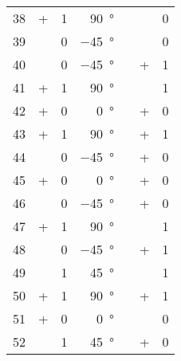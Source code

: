 \begin{longtable}[c]{rccrccc}
	38\hspace{1.5em} &      + & 1 & \qty{ 90}{\degree}\hspace{1.5em} &  & \times & 0 \\
	39\hspace{1.5em} & \times & 0 & \qty{-45}{\degree}\hspace{1.5em} &  & \times & 0 \\
	40\hspace{1.5em} & \times & 0 & \qty{-45}{\degree}\hspace{1.5em} &  &      + & 1 \\
	41\hspace{1.5em} &      + & 1 & \qty{ 90}{\degree}\hspace{1.5em} &  & \times & 1 \\
	42\hspace{1.5em} &      + & 0 & \qty{  0}{\degree}\hspace{1.5em} &  &      + & 0 \\
	43\hspace{1.5em} &      + & 1 & \qty{ 90}{\degree}\hspace{1.5em} &  &      + & 1 \\
	44\hspace{1.5em} & \times & 0 & \qty{-45}{\degree}\hspace{1.5em} &  &      + & 0 \\
	45\hspace{1.5em} &      + & 0 & \qty{  0}{\degree}\hspace{1.5em} &  &      + & 0 \\
	46\hspace{1.5em} & \times & 0 & \qty{-45}{\degree}\hspace{1.5em} &  &      + & 0 \\
	47\hspace{1.5em} &      + & 1 & \qty{ 90}{\degree}\hspace{1.5em} &  & \times & 1 \\
	48\hspace{1.5em} & \times & 0 & \qty{-45}{\degree}\hspace{1.5em} &  &      + & 1 \\
	49\hspace{1.5em} & \times & 1 & \qty{ 45}{\degree}\hspace{1.5em} &  & \times & 1 \\
	50\hspace{1.5em} &      + & 1 & \qty{ 90}{\degree}\hspace{1.5em} &  &      + & 1 \\
	51\hspace{1.5em} &      + & 0 & \qty{  0}{\degree}\hspace{1.5em} &  & \times & 0 \\
	52\hspace{1.5em} & \times & 1 & \qty{ 45}{\degree}\hspace{1.5em} &  &      + & 0 \\
	\bottomrule
\end{longtable}
